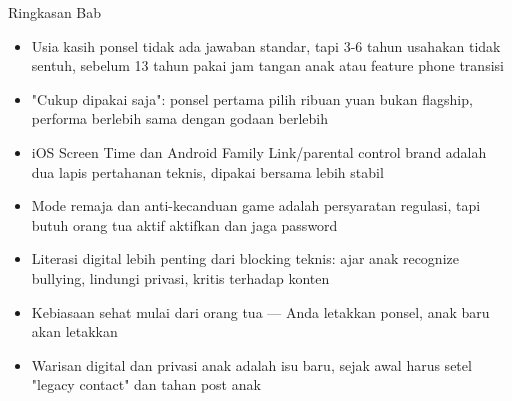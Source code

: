 \begin{tcbsummary}{Ringkasan Bab}
\begin{itemize}
  \item Usia kasih ponsel tidak ada jawaban standar, tapi 3-6 tahun usahakan tidak sentuh, sebelum 13 tahun pakai jam tangan anak atau feature phone transisi
  \item "Cukup dipakai saja": ponsel pertama pilih ribuan yuan bukan flagship, performa berlebih sama dengan godaan berlebih
  \item iOS Screen Time dan Android Family Link/parental control brand adalah dua lapis pertahanan teknis, dipakai bersama lebih stabil
  \item Mode remaja dan anti-kecanduan game adalah persyaratan regulasi, tapi butuh orang tua aktif aktifkan dan jaga password
  \item Literasi digital lebih penting dari blocking teknis: ajar anak recognize bullying, lindungi privasi, kritis terhadap konten
  \item Kebiasaan sehat mulai dari orang tua — Anda letakkan ponsel, anak baru akan letakkan
  \item Warisan digital dan privasi anak adalah isu baru, sejak awal harus setel "legacy contact" dan tahan post anak
\end{itemize}

\end{tcbsummary}
